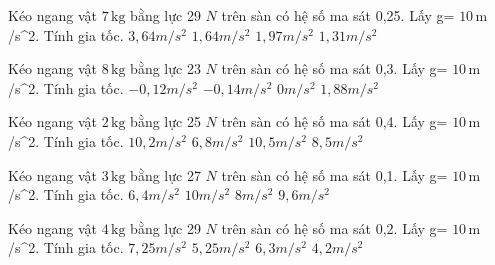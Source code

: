 \begin{ex}
Kéo ngang vật $7\,\text{kg}$ bằng lực 29 $N$ trên sàn có hệ số ma sát 0,25. Lấy g= $10\,\text{m}$ /s^2. Tính gia tốc.
\choice
{$3,64 m/s^2$}
{\True $1,64 m/s^2$}
{$1,97 m/s^2$}
{$1,31 m/s^2$}
\end{ex}

\begin{ex}
Kéo ngang vật $8\,\text{kg}$ bằng lực 23 $N$ trên sàn có hệ số ma sát 0,3. Lấy g= $10\,\text{m}$ /s^2. Tính gia tốc.
\choice
{\True $-0,12 m/s^2$}
{$-0,14 m/s^2$}
{$0 m/s^2$}
{$1,88 m/s^2$}
\end{ex}

\begin{ex}
Kéo ngang vật $2\,\text{kg}$ bằng lực 25 $N$ trên sàn có hệ số ma sát 0,4. Lấy g= $10\,\text{m}$ /s^2. Tính gia tốc.
\choice
{$10,2 m/s^2$}
{$6,8 m/s^2$}
{$10,5 m/s^2$}
{\True $8,5 m/s^2$}
\end{ex}

\begin{ex}
Kéo ngang vật $3\,\text{kg}$ bằng lực 27 $N$ trên sàn có hệ số ma sát 0,1. Lấy g= $10\,\text{m}$ /s^2. Tính gia tốc.
\choice
{$6,4 m/s^2$}
{$10 m/s^2$}
{\True $8 m/s^2$}
{$9,6 m/s^2$}
\end{ex}

\begin{ex}
Kéo ngang vật $4\,\text{kg}$ bằng lực 29 $N$ trên sàn có hệ số ma sát 0,2. Lấy g= $10\,\text{m}$ /s^2. Tính gia tốc.
\choice
{$7,25 m/s^2$}
{\True $5,25 m/s^2$}
{$6,3 m/s^2$}
{$4,2 m/s^2$}
\end{ex}

